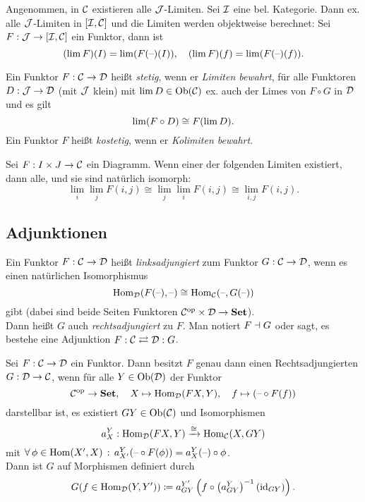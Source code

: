 \documentclass{cheat-sheet}
\begin{document}
\begin{bem}
  Angenommen, in $\mathcal{C}$ existieren alle $\mathcal{J}$-Limiten.
  Sei $\mathcal{I}$ eine bel. Kategorie.
  Dann ex. alle $\mathcal{J}$-Limiten in $[\mathcal{I}, \mathcal{C}]$ und die Limiten werden objektweise berechnet:
  Sei $F : \mathcal{J} \to [\mathcal{I}, \mathcal{C}]$ ein Funktor, dann ist
  \[
    (\lim F)(I) = \lim (F(\text{--})(I)), \quad
    (\lim F)(f) = \lim (F(\text{--})(f)).
  \]
\end{bem}

\begin{defn}
  Ein Funktor $F : \mathcal{C} \to \mathcal{D}$ heißt \emph{stetig}, wenn er \emph{Limiten bewahrt}, \dh{} für alle Funktoren $D : \mathcal{J} \to \mathcal{D}$ (mit $\mathcal{J}$ klein) mit $\lim D \in \operatorname{Ob}(\mathcal{C})$ ex. auch der Limes von $F \circ G$ in $\mathcal{D}$ und es gilt
  \[ \lim (F \circ D) \cong F(\lim D). \]
  Ein Funktor $F$ heißt \emph{kostetig}, wenn er \emph{Kolimiten bewahrt}.
\end{defn}

\begin{satz}
  Sei $F : I \times J \to \mathcal{C}$ ein Diagramm. Wenn einer der folgenden Limiten existiert, dann alle, und sie sind natürlich isomorph:
  \[ \lim_i \lim_j F(i, j) \cong \lim_j \lim_i F(i, j) \cong \lim_{i,j} F(i, j). \]
\end{satz}

\begin{samepage}
  \subsection{Adjunktionen}
\end{samepage}

\begin{defn}
  Ein Funktor $F : \mathcal{C} \to \mathcal{D}$ heißt \emph{linksadjungiert} zum Funktor $G : \mathcal{C} \to \mathcal{D}$, wenn es einen natürlichen Isomorphismus
  \[
    \operatorname{Hom}_{\mathcal{D}}(F(\text{--}), \text{--}) \cong \operatorname{Hom}_{\mathcal{C}}(\text{--}, G(\text{--}))
  \]
  gibt (dabei sind beide Seiten Funktoren $\mathcal{C}^{\mathrm{op}} \times \mathcal{D} \to \mathbf{Set}$). \\
  Dann heißt $G$ auch \emph{rechtsadjungiert} zu $F$. Man notiert $F \dashv G$ oder sagt, es bestehe eine Adjunktion \enspace $F : \mathcal{C} \rightleftarrows \mathcal{D} : G$.
\end{defn}

\begin{bem}
  Sei $F : \mathcal{C} \to \mathcal{D}$ ein Funktor.
  Dann besitzt $F$ genau dann einen Rechtsadjungierten $G : \mathcal{D} \to \mathcal{C}$, wenn für alle $Y \in \operatorname{Ob}(\mathcal{D})$ der Funktor
  \[
    \mathcal{C}^{\mathrm{op}} \to \mathbf{Set}, \quad
    X \mapsto \operatorname{Hom}_{\mathcal{D}}(FX, Y), \quad
    f \mapsto (\text{--} \circ F(f))
  \]
  darstellbar ist, \dh{} es existiert $GY \in \operatorname{Ob}(\mathcal{C})$ und Isomorphismen
  \[ a^Y_X : \operatorname{Hom}_{\mathcal{D}}(FX, Y) \xrightarrow{\cong} \operatorname{Hom}_{\mathcal{C}}(X, GY) \]
  mit $\forall \, {\phi \in \operatorname{Hom}(X', X)} \,:\, a^Y_{X'}(\text{--} \circ F(\phi)) = a^Y_X(\text{--}) \circ \phi$. \\
  Dann ist $G$ auf Morphismen definiert durch
  \[ G(f \in \operatorname{Hom}_{\mathcal{D}}(Y, Y')) \coloneqq a^{Y'}_{GY} \left( f \circ \left( a^Y_{GY} \right)^{-1} (\operatorname{id}_{GY}) \right). \]
\end{bem}
\end{document}
